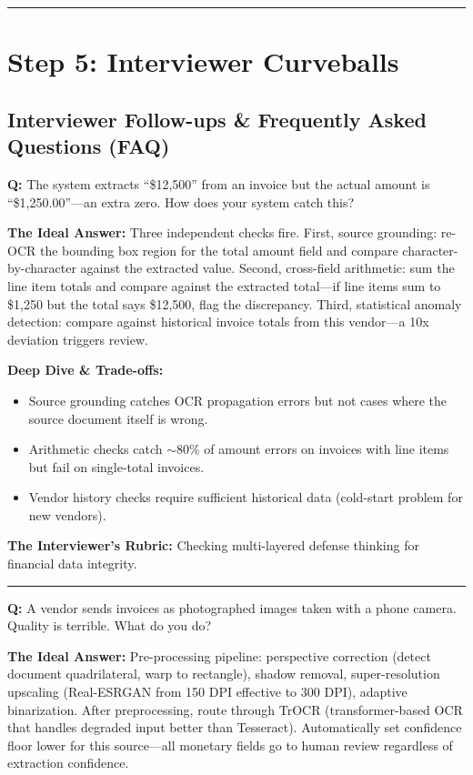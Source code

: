 \bigskip\hrule\bigskip

\section*{Step 5: Interviewer Curveballs}

\subsection*{Interviewer Follow-ups \& Frequently Asked Questions (FAQ)}

\textbf{Q:} The system extracts ``\$12,500'' from an invoice but the actual amount is ``\$1,250.00''---an extra zero. How does your system catch this?

\textbf{The Ideal Answer:} Three independent checks fire. First, source grounding: re-OCR the bounding box region for the total amount field and compare character-by-character against the extracted value. Second, cross-field arithmetic: sum the line item totals and compare against the extracted total---if line items sum to \$1,250 but the total says \$12,500, flag the discrepancy. Third, statistical anomaly detection: compare against historical invoice totals from this vendor---a 10x deviation triggers review.

\textbf{Deep Dive \& Trade-offs:}
\begin{itemize}
  \item Source grounding catches OCR propagation errors but not cases where the source document itself is wrong.
  \item Arithmetic checks catch $\sim$80\% of amount errors on invoices with line items but fail on single-total invoices.
  \item Vendor history checks require sufficient historical data (cold-start problem for new vendors).
\end{itemize}

\textbf{The Interviewer's Rubric:} Checking multi-layered defense thinking for financial data integrity.

\bigskip\hrule\bigskip

\textbf{Q:} A vendor sends invoices as photographed images taken with a phone camera. Quality is terrible. What do you do?

\textbf{The Ideal Answer:} Pre-processing pipeline: perspective correction (detect document quadrilateral, warp to rectangle), shadow removal, super-resolution upscaling (Real-ESRGAN from 150 DPI effective to 300 DPI), adaptive binarization. After preprocessing, route through TrOCR (transformer-based OCR that handles degraded input better than Tesseract). Automatically set confidence floor lower for this source---all monetary fields go to human review regardless of extraction confidence.

